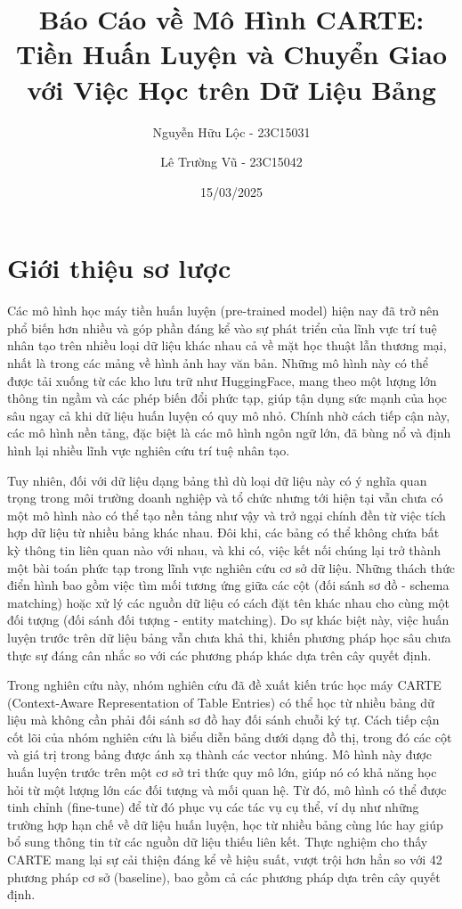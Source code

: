 \documentclass{article}
\title{Báo Cáo về Mô Hình CARTE: Tiền Huấn Luyện và Chuyển Giao với Việc Học trên Dữ Liệu Bảng}
\author{Nguyễn Hữu Lộc - 23C15031 \and Lê Trường Vũ - 23C15042}
\date{15/03/2025}
\begin{document}
\maketitle

\tableofcontents


\section{Giới thiệu sơ lược}
Các mô hình học máy tiền huấn luyện (pre-trained model) hiện nay đã trở nên phổ biến hơn nhiều và góp phần đáng kể vào sự phát triển của lĩnh vực trí tuệ nhân tạo trên nhiều loại dữ liệu khác nhau cả về mặt học thuật lẫn thương mại, nhất là trong các mảng về hình ảnh hay văn bản. Những mô hình này có thể được tải xuống từ các kho lưu trữ như HuggingFace, mang theo một lượng lớn thông tin ngầm và các phép biến đổi phức tạp, giúp tận dụng sức mạnh của học sâu ngay cả khi dữ liệu huấn luyện có quy mô nhỏ. Chính nhờ cách tiếp cận này, các mô hình nền tảng, đặc biệt là các mô hình ngôn ngữ lớn, đã bùng nổ và định hình lại nhiều lĩnh vực nghiên cứu trí tuệ nhân tạo. 

Tuy nhiên, đối với dữ liệu dạng bảng thì dù loại dữ liệu này có ý nghĩa quan trọng trong môi trường doanh nghiệp và tổ chức nhưng tới hiện tại vẫn chưa có một mô hình nào có thể tạo nền tảng như vậy và trở ngại chính đền từ việc tích hợp dữ liệu từ nhiều bảng khác nhau. Đôi khi, các bảng có thể không chứa bất kỳ thông tin liên quan nào với nhau, và khi có, việc kết nối chúng lại trở thành một bài toán phức tạp trong lĩnh vực nghiên cứu cơ sở dữ liệu. Những thách thức điển hình bao gồm việc tìm mối tương ứng giữa các cột (đối sánh sơ đồ - schema matching) hoặc xử lý các nguồn dữ liệu có cách đặt tên khác nhau cho cùng một đối tượng (đối sánh đối tượng - entity matching). Do sự khác biệt này, việc huấn luyện trước trên dữ liệu bảng vẫn chưa khả thi, khiến phương pháp học sâu chưa thực sự đáng cân nhắc so với các phương pháp khác dựa trên cây quyết định.

Trong nghiên cứu này, nhóm nghiên cứu đã đề xuất kiến trúc học máy CARTE (Context-Aware Representation of Table Entries) có thể học từ nhiều bảng dữ liệu mà không cần phải đối sánh sơ đồ hay đối sánh chuỗi ký tự. Cách tiếp cận cốt lõi của nhóm nghiên cứu là biểu diễn bảng dưới dạng đồ thị, trong đó các cột và giá trị trong bảng được ánh xạ thành các vector nhúng. Mô hình này được huấn luyện trước trên một cơ sở tri thức quy mô lớn, giúp nó có khả năng học hỏi từ một lượng lớn các đối tượng và mối quan hệ. Từ đó, mô hình có thể được tinh chỉnh (fine-tune) để từ đó phục vụ các tác vụ cụ thể, ví dụ như những trường hợp hạn chế về dữ liệu huấn luyện, học từ nhiều bảng cùng lúc hay giúp bổ sung thông tin từ các nguồn dữ liệu thiếu liên kết. Thực nghiệm cho thấy CARTE mang lại sự cải thiện đáng kể về hiệu suất, vượt trội hơn hẳn so với 42 phương pháp cơ sở (baseline), bao gồm cả các phương pháp dựa trên cây quyết định.
\end{document}
